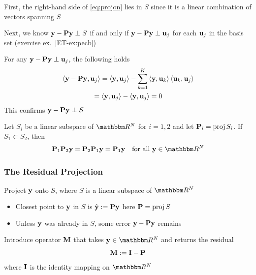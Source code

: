 \begin{frame}

     \vspace{2em}
    \Prf 
     First, the right-hand side of \eqref{eq:projon} lies in $S$ 
    since it is a linear combination of vectors spanning $S$
    
    Next, we know ${\mathbf y} - \mathbf P {\mathbf y} \perp S$ if and only if 
    ${\mathbf y} - \mathbf P {\mathbf y} \perp {\mathbf u}_j$ for each ${\mathbf u}_j$ in the 
    basis set (exercise ex.~\ref{ET-ex:pecb})
    
    For any ${\mathbf y} - \mathbf P {\mathbf y} \perp {\mathbf u}_j$, the following holds
    \begin{multline*}
        \left\langle{ {\mathbf y} - \mathbf P {\mathbf y} ,  {\mathbf u} _j}\right\rangle
        = \left\langle{ {\mathbf y} ,  {\mathbf u} _j }\right\rangle
        -  \sum_{k=1}^K \left\langle{ {\mathbf y} ,  {\mathbf u} _k}\right\rangle \left\langle{ {\mathbf u} _k,  {\mathbf u} _j}\right\rangle
        \\ = \left\langle{ {\mathbf y} ,  {\mathbf u} _j}\right\rangle - \left\langle{ {\mathbf y} ,  {\mathbf u} _j }\right\rangle
        = 0
    \end{multline*}
    This confirms ${\mathbf y} - \mathbf P {\mathbf y} \perp S$ 
    
\end{frame}

\begin{frame}

     \vspace{2em}
    \Fact{\eqref{ET-fa:subsub}}
    Let $S_i$ be a linear subspace of $\RR^N$ for $i=1,2$ and let $\mathbf P_i =
    \operatorname{proj} S_i$.  If $S_1 \subset S_2$, then
    \begin{equation*}
        \boldP_1 \boldP_2 \boldy = \boldP_2 \boldP_1 \boldy = \boldP_1 \boldy
        \quad \text{for all } \boldy \in \RR^N
    \end{equation*}

\end{frame}

\begin{frame}\frametitle{The Residual Projection}

    \vspace{2em}
    Project ${\mathbf y}$ onto $S$, where $S$ is a linear subspace of $\RR^N$
    \begin{itemize}
    \item Closest point to ${\mathbf y}$ in $S$ is $\hat {\mathbf y} := \mathbf P {\mathbf y}$ 
		    here $\mathbf P = \operatorname{proj} S$
    \item Unless ${\mathbf y}$ was already in $S$, some error ${\mathbf y} -
    \mathbf P {\mathbf y}$ remains
    \end{itemize}
    
    \vspace{.7em}
    Introduce operator $\mathbf M$ that takes $\boldy \in \RR^N$
    and returns the residual
    \begin{equation}
        \label{eq:ann0}
        \mathbf M := \mathbf I - \mathbf P
    \end{equation}
    where $\mathbf I$ is the identity mapping on $\RR^N$
    
\end{frame}

